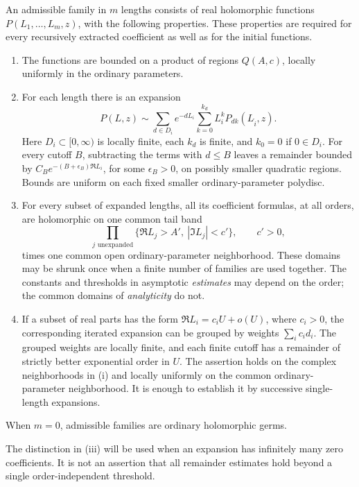 \begin{definition}\label{path:def-admissible}
An admissible family in \(m\) lengths consists of real holomorphic functions
\(P(L_1,\ldots,L_m,z)\), with the following properties.  These properties
are required for every recursively extracted coefficient as well as for the
initial functions.
\begin{enumerate}[label=\textup{(\roman*)}]
\item The functions are bounded on a product of regions \(Q(A,c)\), locally
uniformly in the ordinary parameters.
\item For each length there is an expansion
\begin{equation}\label{path:eq-expansion}
 P(L,z)\sim\sum_{d\in D_i}e^{-dL_i}
             \sum_{k=0}^{k_d}L_i^k P_{dk}(L_{\widehat i},z).
\end{equation}
Here \(D_i\subset[0,\infty)\) is locally finite, each \(k_d\) is finite,
and \(k_0=0\) if \(0\in D_i\).  For every cutoff \(B\), subtracting the
terms with \(d\le B\) leaves a remainder bounded by
\(C_Be^{-(B+\epsilon_B)\Re L_i}\), for some \(\epsilon_B>0\), on
possibly smaller quadratic regions.  Bounds are uniform on each fixed
smaller ordinary-parameter polydisc.
\item For every subset of expanded lengths, all its coefficient formulas,
at all orders, are holomorphic on one common tail band
\[
 \prod_{j\text{ unexpanded}}
 \{\Re L_j>A',\ |\Im L_j|<c'\},\qquad c'>0,
\]
times one common open ordinary-parameter neighborhood.  These domains may
be shrunk once when a finite number of families are used together.  The
constants and thresholds in asymptotic \emph{estimates} may depend on the
order; the common domains of \emph{analyticity} do not.
\item If a subset of real parts has the form
\(\Re L_i=c_iU+o(U)\), where \(c_i>0\), the corresponding iterated
expansion can be grouped by weights \(\sum_i c_id_i\).  The grouped
weights are locally finite, and each finite cutoff has a remainder of
strictly better exponential order in \(U\).  The assertion holds on the
complex neighborhoods in \textup{(i)} and locally uniformly on the common
ordinary-parameter neighborhood.  It is enough to establish it by
successive single-length expansions.
\end{enumerate}
When \(m=0\), admissible families are ordinary holomorphic germs.
\end{definition}

The distinction in \textup{(iii)} will be used when an expansion has
infinitely many zero coefficients.  It is not an assertion that all
remainder estimates hold beyond a single order-independent threshold.

